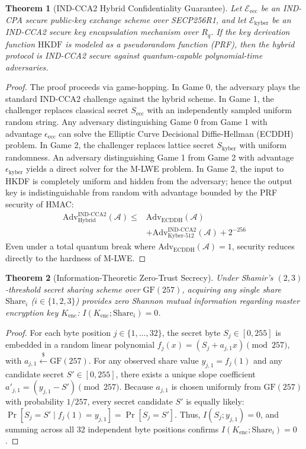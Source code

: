 \documentclass[sn-mathphys,Numbered]{sn-jnl}%
\theoremstyle{thmstyleone}%
\newtheorem{theorem}{Theorem}%
\theoremstyle{thmstyletwo}%
\theoremstyle{thmstylethree}%
\begin{document}
\begin{theorem}[IND-CCA2 Hybrid Confidentiality Guarantee]
Let $\mathcal{E}_{\text{ecc}}$ be an IND-CPA secure public-key exchange scheme over SECP256R1, and let $\mathcal{E}_{\text{kyber}}$ be an IND-CCA2 secure key encapsulation mechanism over $R_q$. If the key derivation function $\text{HKDF}$ is modeled as a pseudorandom function (PRF), then the hybrid protocol is IND-CCA2 secure against quantum-capable polynomial-time adversaries.
\end{theorem}
\begin{proof}
The proof proceeds via game-hopping. In Game 0, the adversary plays the standard IND-CCA2 challenge against the hybrid scheme. In Game 1, the challenger replaces classical secret $S_{\text{ecc}}$ with an independently sampled uniform random string. Any adversary distinguishing Game 0 from Game 1 with advantage $\epsilon_{\text{ecc}}$ can solve the Elliptic Curve Decisional Diffie-Hellman (ECDDH) problem. In Game 2, the challenger replaces lattice secret $S_{\text{kyber}}$ with uniform randomness. An adversary distinguishing Game 1 from Game 2 with advantage $\epsilon_{\text{kyber}}$ yields a direct solver for the M-LWE problem. In Game 2, the input to HKDF is completely uniform and hidden from the adversary; hence the output key is indistinguishable from random with advantage bounded by the PRF security of HMAC:
\begin{equation}
\begin{split}
\text{Adv}_{\text{Hybrid}}^{\text{IND-CCA2}}(\mathcal{A}) \le {} & \text{Adv}_{\text{ECDDH}}(\mathcal{A}) \\
& + \text{Adv}_{\text{Kyber-512}}^{\text{IND-CCA2}}(\mathcal{A}) + 2^{-256}
\end{split}
\end{equation}
Even under a total quantum break where $\text{Adv}_{\text{ECDDH}}(\mathcal{A}) = 1$, security reduces directly to the hardness of M-LWE.
\end{proof}

\begin{theorem}[Information-Theoretic Zero-Trust Secrecy]
Under Shamir's $(2,3)$-threshold secret sharing scheme over $\text{GF}(257)$, acquiring any single share $\text{Share}_i$ ($i \in \{1, 2, 3\}$) provides zero Shannon mutual information regarding master encryption key $K_{\text{enc}}$: $I(K_{\text{enc}}; \text{Share}_i) = 0$.
\end{theorem}
\begin{proof}
For each byte position $j \in \{1, \dots, 32\}$, the secret byte $S_j \in [0, 255]$ is embedded in a random linear polynomial $f_j(x) = (S_j + a_{j,1} x) \pmod{257}$, with $a_{j,1} \xleftarrow{\$} \text{GF}(257)$. For any observed share value $y_{j,1} = f_j(1)$ and any candidate secret $S' \in [0, 255]$, there exists a unique slope coefficient $a'_{j,1} = (y_{j,1} - S') \pmod{257}$. Because $a_{j,1}$ is chosen uniformly from $\text{GF}(257)$ with probability $1/257$, every secret candidate $S'$ is equally likely: $\Pr[S_j = S' \mid f_j(1) = y_{j,1}] = \Pr[S_j = S']$. Thus, $I(S_j; y_{j,1}) = 0$, and summing across all 32 independent byte positions confirms $I(K_{\text{enc}}; \text{Share}_i) = 0$.
\end{proof}
\end{document}
